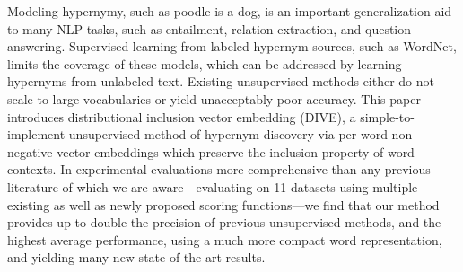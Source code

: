 Modeling hypernymy, such as poodle is-a dog, is an important generalization aid to many NLP tasks, such as entailment, relation extraction, and question answering. Supervised learning from labeled hypernym sources, such as WordNet, limits the coverage of these models, which can be addressed by learning hypernyms from unlabeled text. Existing unsupervised methods either do not scale to large vocabularies or yield unacceptably poor accuracy.  This paper introduces distributional inclusion vector embedding (DIVE), a simple-to-implement unsupervised method of hypernym discovery via per-word non-negative vector embeddings which preserve the inclusion property of word contexts. In experimental evaluations more comprehensive than any previous literature of which we are aware---evaluating on 11 datasets using multiple existing as well as newly proposed scoring functions---we find that our method provides up to double the precision of previous unsupervised methods, and the highest average performance, using a much more compact word representation, and yielding many new state-of-the-art results.
